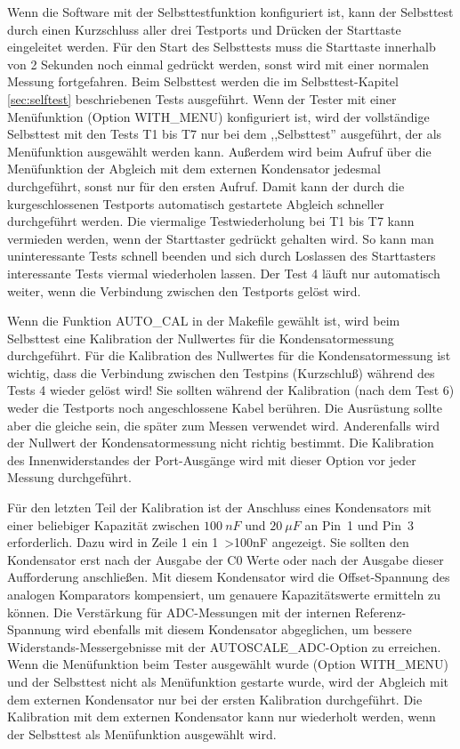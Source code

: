 Wenn die Software mit der Selbsttestfunktion konfiguriert ist, kann der Selbsttest durch einen Kurzschluss aller drei
Testports und Drücken der Starttaste eingeleitet werden.
Für den Start des Selbsttests muss die Starttaste innerhalb von 2 Sekunden noch einmal gedrückt werden,
sonst wird mit einer normalen Messung fortgefahren.
Beim Selbsttest werden die im Selbsttest-Kapitel \ref{sec:selftest} beschriebenen Tests ausgeführt.
Wenn der Tester mit einer Menüfunktion (Option WITH\_MENU) konfiguriert ist, 
wird der vollständige Selbsttest mit den Tests T1 bis T7 nur bei dem ,,Selbsttest'' ausgeführt, 
der als Menüfunktion ausgewählt werden kann.
Außerdem wird beim Aufruf über die Menüfunktion der Abgleich mit dem externen Kondensator jedesmal durchgeführt,
sonst nur für den ersten Aufruf.
Damit kann der durch die kurgeschlossenen Testports automatisch gestartete Abgleich schneller durchgeführt werden. 
Die viermalige Testwiederholung bei T1 bis T7 kann vermieden werden, wenn der Starttaster gedrückt gehalten wird.
So kann man uninteressante Tests schnell beenden und
sich durch Loslassen des Starttasters interessante Tests viermal wiederholen lassen.
Der Test 4 läuft nur automatisch weiter, wenn die Verbindung zwischen den Testports gelöst wird.

Wenn die Funktion AUTO\_CAL in der Makefile gewählt ist, wird beim Selbsttest
eine Kalibration der Nullwertes für die Kondensatormessung durchgeführt.
Für die Kalibration des Nullwertes für die Kondensatormessung ist wichtig, 
dass die Verbindung zwischen den Testpins (Kurzschluß) während des Tests 4 wieder gelöst wird!
Sie sollten während der Kalibration (nach dem Test 6) weder die Testports noch angeschlossene Kabel berühren.
Die Ausrüstung sollte aber die gleiche sein, die später zum Messen verwendet wird.
Anderenfalls wird der Nullwert der Kondensatormessung nicht richtig bestimmt.
Die Kalibration des Innenwiderstandes der Port-Ausgänge wird mit dieser Option vor jeder
Messung durchgeführt.

Für den letzten Teil der Kalibration ist der Anschluss eines Kondensators 
mit einer beliebiger Kapazität zwischen \(100~nF\) und \(20~\mu F\) an Pin~1 und Pin~3 erforderlich.
Dazu wird in Zeile 1 ein \mbox{1 \textgreater 100nF} angezeigt.
Sie sollten den Kondensator erst nach der Ausgabe der C0 Werte oder nach der Ausgabe dieser Aufforderung anschließen.
Mit diesem Kondensator wird die Offset-Spannung des analogen Komparators kompensiert,
um genauere Kapazitätswerte ermitteln zu können.
Die Verstärkung für ADC-Messungen mit der internen Referenz-Spannung wird ebenfalls mit diesem Kondensator abgeglichen, um
bessere Widerstands-Messergebnisse mit der AUTOSCALE\_ADC-Option zu erreichen.
Wenn die Menüfunktion beim Tester ausgewählt wurde (Option WITH\_MENU) und der Selbsttest
nicht als Menüfunktion gestarte wurde, wird der Abgleich mit dem externen Kondensator nur bei
der ersten Kalibration durchgeführt.
Die Kalibration mit dem externen Kondensator kann nur wiederholt werden, wenn der Selbsttest
als Menüfunktion ausgewählt wird.

